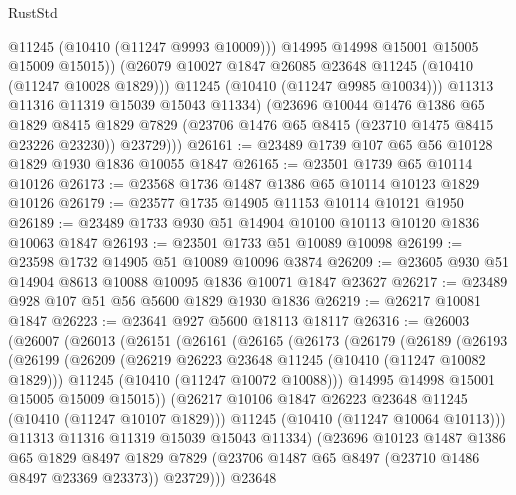 \begin{lexlean}{RustStd}
\begin{coremodule}
                  @11245
                  (@10410 (@11247 @9993 @10009)))
                @14995
                @14998
                @15001
                @15005
                @15009
                @15015))
            (@26079 @10027 @1847 @26085 @23648 @11245 (@10410 (@11247 @10028 @1829)))
            @11245
            (@10410 (@11247 @9985 @10034)))
          @11313
          @11316
          @11319
          @15039
          @15043
          @11334)
        (@23696
          @10044
          @1476
          @1386
          @65
          @1829
          @8415
          @1829
          @7829
          (@23706 @1476 @65 @8415 (@23710 @1475 @8415 @23226 @23230))
          @23729)))
@26161 := @23489 @1739 @107 @65 @56 @10128 @1829 @1930 @1836 @10055 @1847
@26165 := @23501 @1739 @65 @10114 @10126
@26173 := @23568 @1736 @1487 @1386 @65 @10114 @10123 @1829 @10126
@26179 := @23577 @1735 @14905 @11153 @10114 @10121 @1950
@26189 := @23489 @1733 @930 @51 @14904 @10100 @10113 @10120 @1836 @10063 @1847
@26193 := @23501 @1733 @51 @10089 @10098
@26199 := @23598 @1732 @14905 @51 @10089 @10096 @3874
@26209 := @23605 @930 @51 @14904 @8613 @10088 @10095 @1836 @10071 @1847 @23627
@26217 := @23489 @928 @107 @51 @56 @5600 @1829 @1930 @1836
@26219 := @26217 @10081 @1847
@26223 := @23641 @927 @5600 @18113 @18117
@26316 := @26003
    (@26007
      (@26013
        (@26151
          (@26161
            (@26165
              (@26173
                (@26179
                  (@26189
                    (@26193
                      (@26199
                        (@26209
                          (@26219 @26223 @23648 @11245 (@10410 (@11247 @10082 @1829)))
                          @11245
                          (@10410 (@11247 @10072 @10088)))
                        @14995
                        @14998
                        @15001
                        @15005
                        @15009
                        @15015))
                    (@26217 @10106 @1847 @26223 @23648 @11245 (@10410 (@11247 @10107 @1829)))
                    @11245
                    (@10410 (@11247 @10064 @10113)))
                  @11313
                  @11316
                  @11319
                  @15039
                  @15043
                  @11334)
                (@23696
                  @10123
                  @1487
                  @1386
                  @65
                  @1829
                  @8497
                  @1829
                  @7829
                  (@23706 @1487 @65 @8497 (@23710 @1486 @8497 @23369 @23373))
                  @23729)))
            @23648

\end{coremodule}
\end{lexlean}
